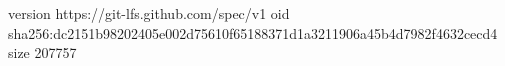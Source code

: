 version https://git-lfs.github.com/spec/v1
oid sha256:dc2151b98202405e002d75610f65188371d1a3211906a45b4d7982f4632cecd4
size 207757
